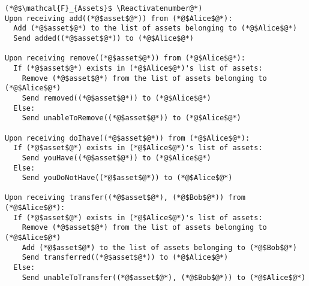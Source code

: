 \Suppressnumber
\begin{lstlisting}[label=assetsfunc, style=numbers]
(*@$\mathcal{F}_{Assets}$ \Reactivatenumber@*)
Upon receiving add((*@$asset$@*)) from (*@$Alice$@*):
  Add (*@$asset$@*) to the list of assets belonging to (*@$Alice$@*)
  Send added((*@$asset$@*)) to (*@$Alice$@*)

Upon receiving remove((*@$asset$@*)) from (*@$Alice$@*):
  If (*@$asset$@*) exists in (*@$Alice$@*)'s list of assets:
    Remove (*@$asset$@*) from the list of assets belonging to (*@$Alice$@*)
    Send removed((*@$asset$@*)) to (*@$Alice$@*)
  Else:
    Send unableToRemove((*@$asset$@*)) to (*@$Alice$@*)

Upon receiving doIhave((*@$asset$@*)) from (*@$Alice$@*):
  If (*@$asset$@*) exists in (*@$Alice$@*)'s list of assets:
    Send youHave((*@$asset$@*)) to (*@$Alice$@*)
  Else:
    Send youDoNotHave((*@$asset$@*)) to (*@$Alice$@*)

Upon receiving transfer((*@$asset$@*), (*@$Bob$@*)) from (*@$Alice$@*):
  If (*@$asset$@*) exists in (*@$Alice$@*)'s list of assets:
    Remove (*@$asset$@*) from the list of assets belonging to (*@$Alice$@*)
    Add (*@$asset$@*) to the list of assets belonging to (*@$Bob$@*)
    Send transferred((*@$asset$@*)) to (*@$Alice$@*)
  Else:
    Send unableToTransfer((*@$asset$@*), (*@$Bob$@*)) to (*@$Alice$@*)
\end{lstlisting}
